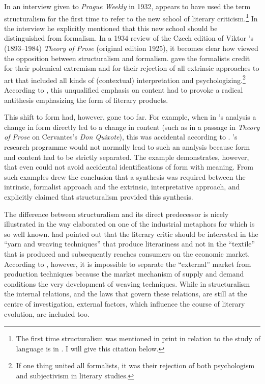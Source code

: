 \documentclass[output=paper]{langscibook}
\begin{document}
In an interview given to \emph{Prague Weekly} in 1932, {\Mukarovsky} appears to have used the term structuralism for the first time to refer to the new school of literary criticism.\footnote{The first time structuralism was mentioned in print in relation to the study of language is in \citet{Jakobson1929}. I will give this citation below.} In the interview he explicitly mentioned that this new school should be distinguished from formalism. In a 1934 review of the Czech edition of Viktor {\Shklovsky}'s (1893--1984) \emph{Theory of Prose} (original edition 1925), it becomes clear how {\Mukarovsky} viewed the opposition between structuralism and formalism. {\Mukarovsky} gave the formalists credit for their polemical extremism and for their rejection of all extrinsic approaches to art that included all kinds of (contextual) interpretation and psychologizing.\footnote{If one thing united all formalists, it was their rejection of both psychologism and subjectivism in literary studies.} According to {\Mukarovsky}, this unqualified emphasis on content had to provoke a radical antithesis emphasizing the form of literary products. 

This shift to form had, however, gone too far. For example, when in {\Shklovsky}'s analysis a change in form directly led to a change in content (such as in a passage in \emph{Theory of Prose} on Cervantes’s \emph{Don Quixote}), this was accidental according to {\Mukarovsky}. {\Shklovsky}'s research programme would not normally lead to such an analysis because form and content had to be strictly separated. The example demonstrates, however, that even {\Shklovsky} could not avoid accidental identifications of form with meaning. From such examples {\Mukarovsky} drew the conclusion that a synthesis was required between the intrinsic, formalist approach and the extrinsic, interpretative approach, and {\Mukarovsky} explicitly claimed that structuralism provided this synthesis. 

The difference between structuralism and its direct predecessor is nicely illustrated in the way {\Mukarovsky} elaborated on one of the industrial metaphors for which {\Shklovsky} is so well known. {\Shklovsky} had pointed out that the literary critic should be interested in the ``yarn and weaving techniques'' that produce literariness and not in the ``textile'' that is produced and subsequently reaches consumers on the economic market.  According to {\Mukarovsky}, however, it is impossible to separate the ``external'' market from production techniques because the market mechanism of supply and demand conditions the very development of weaving techniques. While in structuralism the internal relations, and the laws that govern these relations, are still at the centre of investigation, external factors, which influence the course of literary evolution, are included too. 
\end{document}
